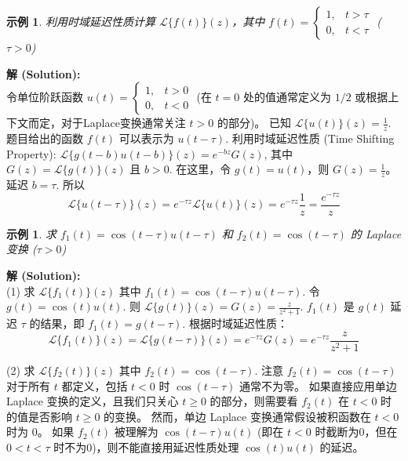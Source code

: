 \documentclass[linespread=1.5,openany]{book}%
\theoremstyle{plain}
\newtheorem{example}[theorem]{示例}
\begin{document}
{{{{{{								\begin{example}利用时域延迟性质计算 $\mathcal{L}\{f(t)\}(z)$，其中 $f(t) = \begin{cases} 1, & t > \tau \\ 0, & t < \tau \end{cases}$ ($\tau>0$) \label{ex:L15_t_shift_delayed_step}
								\end{example}
								\noindent\textbf{解 (Solution):} \\
								令单位阶跃函数 $u(t) = \begin{cases} 1, & t > 0 \\ 0, & t < 0 \end{cases}$ (在 $t=0$ 处的值通常定义为 $1/2$ 或根据上下文而定，对于Laplace变换通常关注 $t>0$ 的部分)。
								已知 $\mathcal{L}\{u(t)\}(z) = \frac{1}{z}$.
								题目给出的函数 $f(t)$ 可以表示为 $u(t-\tau)$.
								利用时域延迟性质 (Time Shifting Property): $\mathcal{L}\{g(t-b)u(t-b)\}(z) = e^{-bz}G(z)$, 其中 $G(z)=\mathcal{L}\{g(t)\}(z)$ 且 $b>0$.
								在这里，令 $g(t)=u(t)$，则 $G(z)=\frac{1}{z}$。延迟 $b=\tau$.
								所以
								\[ \mathcal{L}\{u(t-\tau)\}(z) = e^{-\tau z} \mathcal{L}\{u(t)\}(z) = e^{-\tau z} \frac{1}{z} = \frac{e^{-\tau z}}{z} \]
								\vspace{\baselineskip}
								
								\begin{example}求 $f_1(t)=\cos(t-\tau)u(t-\tau)$ 和 $f_2(t)=\cos(t-\tau)$ 的 Laplace 变换 ($\tau>0$) \label{ex:L15_t_shift_cos_variants}
								\end{example}
								\noindent\textbf{解 (Solution):} \\
								(1) 求 $\mathcal{L}\{f_1(t)\}(z)$ 其中 $f_1(t) = \cos(t-\tau)u(t-\tau)$.
								令 $g(t) = \cos(t)u(t)$. 则 $\mathcal{L}\{g(t)\}(z) = G(z) = \frac{z}{z^2+1}$.
								$f_1(t)$ 是 $g(t)$ 延迟 $\tau$ 的结果，即 $f_1(t) = g(t-\tau)$.
								根据时域延迟性质：
								\[ \mathcal{L}\{f_1(t)\}(z) = \mathcal{L}\{g(t-\tau)\}(z) = e^{-\tau z} G(z) = e^{-\tau z} \frac{z}{z^2+1} \]
								
								(2) 求 $\mathcal{L}\{f_2(t)\}(z)$ 其中 $f_2(t) = \cos(t-\tau)$.
								注意 $f_2(t) = \cos(t-\tau)$ 对于所有 $t$ 都定义，包括 $t<0$ 时 $\cos(t-\tau)$ 通常不为零。
								如果直接应用单边 Laplace 变换的定义，且我们只关心 $t \ge 0$ 的部分，则需要看 $f_2(t)$ 在 $t<0$ 时的值是否影响 $t \ge 0$ 的变换。
								然而，单边 Laplace 变换通常假设被积函数在 $t<0$ 时为 $0$。
								如果 $f_2(t)$ 被理解为 $\cos(t-\tau)u(t)$ (即在 $t<0$ 时截断为0，但在 $0 < t < \tau$ 时不为0)，则不能直接用延迟性质处理 $\cos(t)u(t)$ 的延迟。
								
}}}}}}
\end{document}
